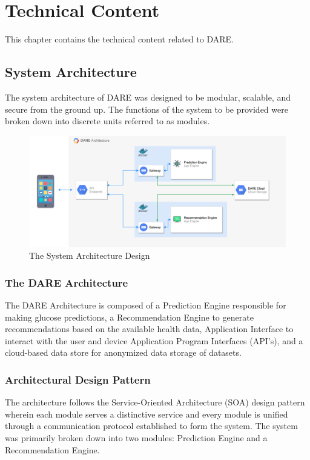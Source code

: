 


\chapter{Technical Content}
\label{cha:technical_content}

This chapter contains the technical content related to DARE.

\section{System Architecture}
\label{sec:system_architecture}
The system architecture of DARE was designed to be modular, scalable, and secure from the ground up. The functions of the system to be provided were broken down into discrete units referred to as modules.

\begin{figure}
\centering
    \includegraphics[width=\textwidth]{Figures/Joe/DARE-Architecture.png}
 	\caption{The System Architecture Design}
  	\label{Figure 1}
\end{figure}

\subsection{The DARE Architecture}
The DARE Architecture is composed of a Prediction Engine responsible for making glucose predictions, a Recommendation Engine to generate recommendations based on the available health data, Application Interface to interact with the user and device Application Program Interfaces (API's), and a cloud-based data store for anonymized data storage of datasets.

\subsection{Architectural Design Pattern}
The architecture follows the Service-Oriented Architecture (SOA) design pattern wherein each module serves a distinctive service and every module is unified through a communication protocol established to form the system\cite{17}. The system was primarily broken down into two modules: Prediction Engine and a Recommendation Engine.

